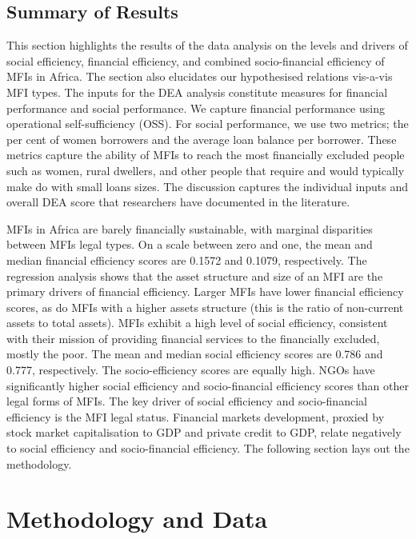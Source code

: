 \documentclass[a4paper, nobind]{templates/ociamthesis}
\begin{document}
\hypertarget{summary-of-results-2}{%
\subsection{Summary of Results}\label{summary-of-results-2}}

This section highlights the results of the data analysis on the levels and drivers of social efficiency, financial efficiency, and combined socio-financial efficiency of MFIs in Africa. The section also elucidates our hypothesised relations vis-a-vis MFI types. The inputs for the DEA analysis constitute measures for financial performance and social performance. We capture financial performance using operational self-sufficiency (OSS). For social performance, we use two metrics; the per cent of women borrowers and the average loan balance per borrower. These metrics capture the ability of MFIs to reach the most financially excluded people such as women, rural dwellers, and other people that require and would typically make do with small loans sizes. The discussion captures the individual inputs and overall DEA score that researchers have documented in the literature.

MFIs in Africa are barely financially sustainable, with marginal disparities between MFIs legal types. On a scale between zero and one, the mean and median financial efficiency scores are 0.1572 and 0.1079, respectively. The regression analysis shows that the asset structure and size of an MFI are the primary drivers of financial efficiency. Larger MFIs have lower financial efficiency scores, as do MFIs with a higher assets structure (this is the ratio of non-current assets to total assets). MFIs exhibit a high level of social efficiency, consistent with their mission of providing financial services to the financially excluded, mostly the poor. The mean and median social efficiency scores are 0.786 and 0.777, respectively. The socio-efficiency scores are equally high. NGOs have significantly higher social efficiency and socio-financial efficiency scores than other legal forms of MFIs. The key driver of social efficiency and socio-financial efficiency is the MFI legal status. Financial markets development, proxied by stock market capitalisation to GDP and private credit to GDP, relate negatively to social efficiency and socio-financial efficiency. The following section lays out the methodology.

\hypertarget{methodology-and-data}{%
\section{Methodology and Data}\label{methodology-and-data}}
\end{document}
